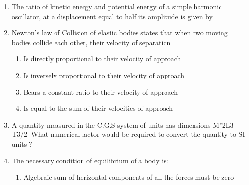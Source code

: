 \documentclass[11pt,a4paper]{article}
\begin{document}
\begin{enumerate}
{}
\\
\item{The ratio of kinetic energy and potential energy of a simple harmonic oscillator, at a displacement equal to half its amplitude is given by}
\\
\item{Newton's law of Collision of elastic bodies states that when two moving bodies collide each other, their velocity of separation}
\begin{enumerate}[label=\Alph*.]
\item{Is directly proportional to their velocity of approach}
\item{Is inversely proportional to their velocity of approach}
\item{Bears a constant ratio to their velocity of approach}
\item{Is equal to the sum of their velocities of approach}
\end{enumerate}
\item{A quantity measured in the C.G.S system of units has dimensions M''2L3 T3/2. What numerical factor would be required to convert the quantity to SI units ?
}
\\
\item{The necessary condition of equilibrium of a body is:}
\begin{enumerate}[label=\Alph*.]
\item{Algebraic sum of horizontal components of all the forces must be zero}

\end{enumerate}
\end{enumerate}
\end{document}
